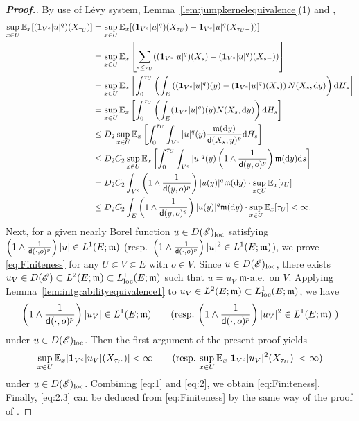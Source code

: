 \documentclass[12pt,a4paper]{article}
\newcommand{\E}{\mathbb{E}}
\renewcommand{\d}{\mathrm{d}}
\newcommand{\m}{\mathfrak{m} }
\newcommand{\loc}{{\rm loc}}
\newcommand{\1}{{\bf 1}}
\begin{document}
\begin{proof}[{\bf Proof.}]
By use of L\'evy system, Lemma~\ref{lem:jumpkernelequivalence}(1) and 
\cite[(A.3.33)]{CFbook}, 
\begin{align*}
\sup_{x\in U}\E_x[(\1_{V^c}|u|^q)(X_{\tau_U})]&=
\sup_{x\in U}\E_x[(\1_{V^c}|u|^q)(X_{\tau_U})-\1_{V^c}|u|^q(X_{\tau_U-}))]\\
&=\sup_{x\in U}\E_x\left[\sum_{s\leq\tau_U}((\1_{V^c}|u|^q)(X_s)-(\1_{V^c}|u|^q)(X_{s-}))\right]\\
&=\sup_{x\in U}\E_x\left[\int_0^{\tau_U}\left(\int_E\left((
\1_{V^c}|u|^q)(y)-(\1_{V^c}|u|^q)(X_s)\right)N(X_s,{\d} y)  \right){\d} H_s \right]\\
&=\sup_{x\in U}\E_x\left[\int_0^{\tau_U}\left(\int_E(\1_{V^c}|u|^q)(y)N(X_s,{\d} y)  \right){\d} H_s \right]\\
&\leq D_2\sup_{x\in U}\E_x\left[\int_0^{\tau_U}
\int_{V^c}|u|^q(y)\frac{{\m}({\d} y)}{{\sf d}(X_s,y)^p}{\d} H_s
\right]
\\
&\leq D_2C_2\sup_{x\in U}\E_x\left[\int_0^{\tau_U}\int_{V^c}|u|^q(y)\left(
1\land \frac{1}{{\sf d}(y,o)^p}
 \right){\m}({\d} y){\d} s \right]\\
 &=D_2C_2\int_{V^c}\left(
1\land \frac{1}{{\sf d}(y,o)^p}
 \right)|u(y)|^q{\m}({\d} y)\cdot\sup_{x\in U}\E_x[\tau_U]\\
 &\leq D_2C_2\int_{E}\left(
1\land \frac{1}{{\sf d}(y,o)^p}
 \right)|u(y)|^q{\m}({\d} y)\cdot\sup_{x\in U}\E_x[\tau_U]<\infty. 
\end{align*}
Next, for a given nearly Borel function $u\in  D(\mathscr{E})_{\loc}$ satisfying $\left(1\land\frac{1}{{\sf d}(\cdot,o)^p} \right)|u|\in L^1(E;{\m})$ (resp.~$\left(1\land\frac{1}{{\sf d}(\cdot,o)^p} \right)|u|^2\in L^1(E;{\m})$), 
we prove \eqref{eq:Finiteness} for any $U\Subset V\Subset E$ with $o\in V$. 
Since $u\in D(\mathscr{E})_{\loc}$, 
there exists $u_V\in D(\mathscr{E})\subset L^2(E;{\m})\subset L^1_{\loc}(E;{\m})$ such that $u=u_V$ ${\m}$-a.e.~on $V$.
Applying Lemma~\ref{lem:intgrabilityequivalence1} to $u_V\in L^2(E;{\m})\subset L^1_{\loc}(E;{\m})$, we have 
\begin{align*}
\left(1\land \frac{1}{{\sf d}(\cdot,o)^p} \right)|u_V|\in L^1(E;{\m}) \qquad 
\text{{\rm(}resp.~$\left(1\land \frac{1}{{\sf d}(\cdot,o)^p} \right)|u_V|^2\in L^1(E;{\m})$ {\rm)}} 
\end{align*}
under $u\in D(\mathscr{E})_{\loc}$.
Then the first argument of the present proof yields 
\begin{align}
\sup_{x\in U}\E_x[\1_{V^c}|u_V|(X_{\tau_U})]<\infty\qquad 
\text{{\rm(}resp.~$\sup_{x\in U}\E_x[\1_{V^c}|u_V|^2(X_{\tau_U})]<\infty${\rm)}}
\label{eq:2}
\end{align}
under $u\in D(\mathscr{E})_{\loc}$. Combining \eqref{eq:1} and \eqref{eq:2}, we obtain \eqref{eq:Finiteness}.
Finally, \eqref{eq:2.3} can be deduced 
from \eqref{eq:Finiteness} 
by the same way of the proof of  \cite[Lemma~2.3]{Chen}.
\end{proof}
\end{document}
